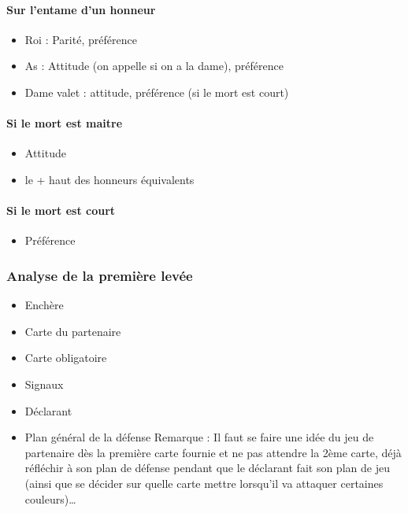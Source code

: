 \documentclass[a4paper]{article}
\begin{document}
\paragraph{Sur l’entame d’un honneur}

\begin{itemize}
\item Roi : Parité, préférence

\item As : Attitude (on appelle si on a la dame), préférence

\item Dame valet : attitude, préférence (si le mort est court)

\end{itemize}

\paragraph{Si le mort est maitre}

\begin{itemize}
\item Attitude

\item le + haut des honneurs équivalents

\end{itemize}

\paragraph{Si le mort est court}

\begin{itemize}
\item Préférence

\end{itemize}

\subsubsection{Analyse de la première levée}

\begin{itemize}
\item Enchère

\item Carte du partenaire

\item Carte obligatoire

\item Signaux

\item Déclarant

\item Plan général de la défense
Remarque : Il faut se faire une idée du jeu de partenaire dès la première carte fournie et ne pas attendre la 2ème carte, déjà réfléchir à son plan de défense pendant que le déclarant fait son plan de jeu (ainsi que se décider sur quelle carte mettre lorsqu’il va attaquer certaines couleurs)…


\end{itemize}
\end{document}
